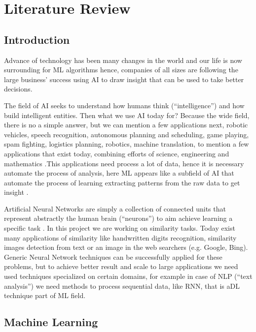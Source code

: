 \documentclass[12pt]{report}
\begin{document}
\onehalfspacing

\chapter{Literature Review} \label{chapter 2}
\section{Introduction}
Advance of technology has been many changes in the world and our life is now surrounding for \ac{ML} algorithms hence, companies of all sizes are following the large business' success using \ac{AI} to draw insight that can be used to take better decisions.

The field of \ac{AI} seeks to understand how humans think (``intelligence'') and how build intelligent entities. Then what we use \ac{AI} today for? Because the wide field, there is no a simple answer, but we can mention a few applications next, robotic vehicles, speech recognition, autonomous planning and scheduling, game playing, spam fighting, logistics planning, robotics, machine translation, to mention a few applications that exist today, combining efforts of science, engineering and mathematics \cite{Russell2010}.This applications need process a lot of data, hence it is necessary automate the process of analysis, here \ac{ML} appears like a subfield of \ac{AI} that automate the process of learning extracting patterns from the raw data to get insight \cite{Kelleher2015}.

Artificial Neural Networks are simply a collection of connected units that represent abstractly the human brain (“neurons”) to aim achieve learning a specific task \cite{Russell2010}. In this project we are working on similarity tasks. Today exist many applications of similarity like handwritten digits recognition, similarity images detection from text or an image in the web searchers (e.g. Google, Bing). Generic Neural Network techniques can be successfully applied for these problems, but to achieve better result and scale to large applications we need used techniques specialized on certain domains, for example in case of \ac{NLP} (``text analysis'') we need methods to process sequential data, like {RNN}, that is a{DL} technique part of {ML} field. \cite{Goodfellow2016}

\section{Machine Learning}
\end{document}
